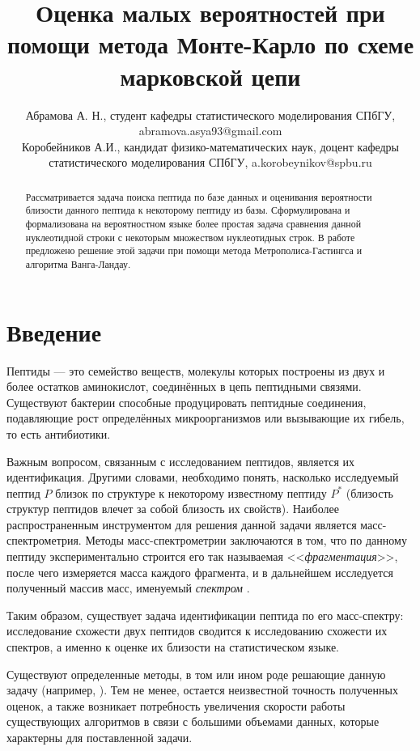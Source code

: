 \documentclass{spisok-article}
\title{ Оценка малых вероятностей при помощи метода Монте-Карло по схеме марковской цепи}
\author{Абрамова А. Н., 
  студент кафедры статистического моделирования СПбГУ,
  abramova.asya93@gmail.com \\
  Коробейников А.И., кандидат физико-математических наук, доцент
кафедры статистического моделирования СПбГУ, a.korobeynikov@spbu.ru
}
\begin{document}
\maketitle

\begin{abstract}
  Рассматривается задача поиска пептида по базе данных и оценивания вероятности близости данного пептида к некоторому пептиду из базы. Сформулирована и формализована на вероятностном языке более простая задача сравнения данной нуклеотидной строки с некоторым множеством нуклеотидных строк. В работе предложено решение этой задачи при помощи метода Метрополиса-Гастингса и алгоритма Ванга-Ландау.

\end{abstract}

\section{Введение}
  Пептиды --- это семейство веществ, молекулы которых построены из двух и более остатков аминокислот, соединённых в цепь пептидными  связями. Существуют бактерии способные продуцировать пептидные соединения, подавляющие рост определённых микроорганизмов или вызывающие их гибель, то есть антибиотики.

  Важным вопросом, связанным с исследованием пептидов, является их идентификация. Другими словами, необходимо понять, насколько исследуемый пептид $P$ близок по структуре к некоторому известному пептиду $P^*$ (близость структур пептидов влечет за собой близость их свойств). Наиболее распространенным инструментом для решения данной задачи является масс-спектрометрия. Методы масс-спектрометрии заключаются в том, что по данному пептиду экспериментально строится его так называемая <<\textit{фрагментация}>>, после чего измеряется масса каждого фрагмента, и в дальнейшем исследуется полученный массив масс, именуемый \textit{спектром} \cite{spectrum}.

  Таким образом, существует задача идентификации пептида по его масс-спектру: исследование схожести двух пептидов сводится к исследованию схожести их спектров, а именно к оценке их близости на статистическом языке.


  Существуют определенные методы, в том или ином роде решающие данную задачу (например, \cite{msdpr}).
  Тем не менее, остается неизвестной точность полученных оценок, а также возникает потребность увеличения скорости работы существующих алгоритмов в связи с большими объемами данных, которые характерны для поставленной задачи.
\end{document}
